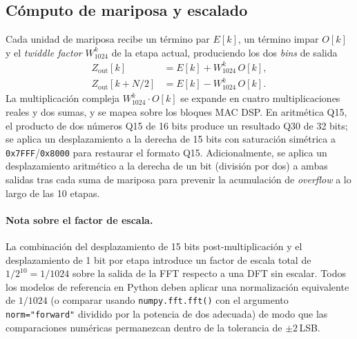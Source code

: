 \documentclass[11pt,a4paper]{article}
\begin{document}
\subsection{Cómputo de mariposa y escalado}
Cada unidad de mariposa recibe un término par $E[k]$, un término impar $O[k]$
y el \emph{twiddle factor} $W_{1024}^{k}$ de la etapa actual, produciendo los
dos \emph{bins} de salida
\begin{align}
  Z_{\text{out}}[k]       &= E[k] + W_{1024}^{k}\,O[k], \\
  Z_{\text{out}}[k + N/2] &= E[k] - W_{1024}^{k}\,O[k].
\end{align}
La multiplicación compleja $W_{1024}^{k}\cdot O[k]$ se expande en cuatro
multiplicaciones reales y dos sumas, y se mapea sobre los bloques MAC DSP. En
aritmética Q15, el producto de dos números Q15 de 16 bits produce un resultado
Q30 de 32 bits; se aplica un desplazamiento a la derecha de 15 bits con
saturación simétrica a \texttt{0x7FFF}/\texttt{0x8000} para restaurar el formato
Q15. Adicionalmente, se aplica un desplazamiento aritmético a la derecha de un
bit (división por dos) a ambas salidas tras cada suma de mariposa para prevenir
la acumulación de \emph{overflow} a lo largo de las 10 etapas.

\paragraph{Nota sobre el factor de escala.} La combinación del desplazamiento de
15 bits post-multiplicación y el desplazamiento de 1 bit por etapa introduce un
factor de escala total de $1/2^{10} = 1/1024$ sobre la salida de la FFT respecto
a una DFT sin escalar. Todos los modelos de referencia en Python deben aplicar
una normalización equivalente de $1/1024$ (o comparar usando
\texttt{numpy.fft.fft()} con el argumento \texttt{norm="forward"} dividido por la
potencia de dos adecuada) de modo que las comparaciones numéricas permanezcan
dentro de la tolerancia de $\pm2$\,LSB.
\end{document}
